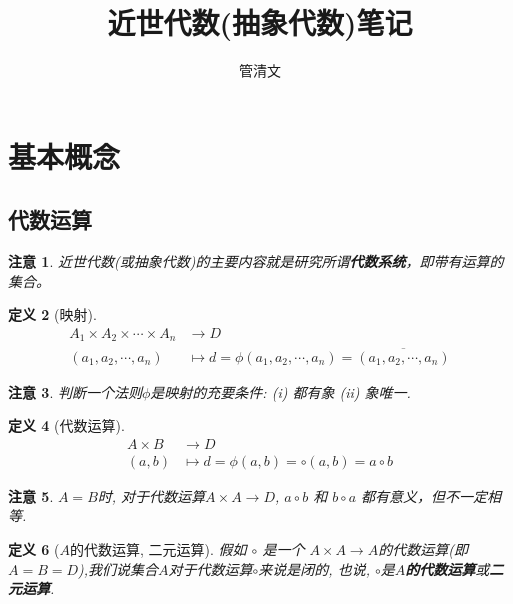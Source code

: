 \documentclass[UTF8]{ctexart}
\newtheorem{Definition}{定义}%
\newtheorem{Remark}[Definition]{注意}
\begin{document}
\title{近世代数(抽象代数)笔记}
\author{管清文}
\maketitle
\tableofcontents
\clearpage

\section{基本概念}

\subsection{代数运算}

\begin{Remark}
近世代数(或抽象代数)的主要内容就是研究所谓\textbf{代数系统}，即带有运算的集合。
\end{Remark}

\begin{Definition}[映射]
$$ \begin{aligned}
A_1 \times A_2 \times \cdots \times A_n &\rightarrow D \\
 (a_1, a_2, \cdots, a_n) &\mapsto d = \phi (a_1, a_2, \cdots, a_n) = \overline{(a_1, a_2, \cdots, a_n)} \end{aligned}$$ 
\end{Definition}

\begin{Remark}
判断一个法则$\phi$是映射的充要条件: (i) 都有象 (ii) 象唯一.
\end{Remark}

\begin{Definition}[代数运算] 
$$\begin{aligned}
A \times B &\rightarrow D \\ 
(a, b) &\mapsto d = \phi(a, b) = \circ (a, b) = a \circ b \end{aligned}$$
\end{Definition}

\begin{Remark}
$A = B$时, 对于代数运算$ A \times A \rightarrow D $, $ a \circ b $ 和 $ b \circ a $ 都有意义，但不一定相等.
\end{Remark}

\begin{Definition}[$A$的代数运算, 二元运算] 
假如 $ \circ $ 是一个 $ A \times A \rightarrow A$的代数运算(即$A = B = D$),我们说集合$A$对于代数运算$\circ$来说是闭的, 也说, $\circ$是\textbf{$A$的代数运算}或\textbf{二元运算}.
\end{Definition}
\end{document}
